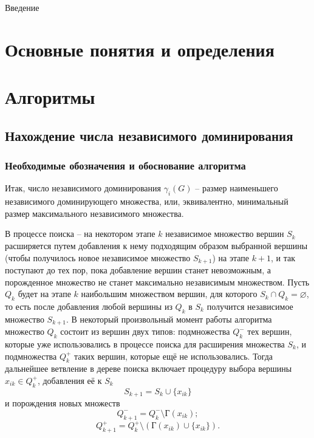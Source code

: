 \documentclass[bachelor, och, nir]{SCWorks}
\begin{document}




\tableofcontents

\intro
Введение

\section{Основные понятия и определения}

\section{Алгоритмы} 
\subsection{Нахождение числа независимого доминирования}
\subsubsection{Необходимые обозначения и обоснование алгоритма}
Итак, число независимого доминирования $\gamma_i(G)$ -- размер наименьшего независимого доминирующего множества,
или, эквивалентно, минимальный размер максимального независимого множества.

В процессе поиска -- на некотором этапе $k$ независимое множество вершин $S_k$ расширяется путем добавления к нему подходящим образом выбранной вершины (чтобы получилось новое независимое множество $S_{k+1}$) на этапе $k+1$, и так поступают до тех пор, пока добавление вершин станет невозможным, а порожденное множество не станет максимально независимым множеством. Пусть $Q_k$ будет на этапе $k$ наибольшим множеством вершин, для которого $S_k \cap Q_k= \varnothing$, то есть после добавления любой вершины из $Q_k$ в $S_k$ получится независимое множество $S_{k+1}$. В некоторый произвольный момент работы алгоритма множество $Q_k$ состоит из вершин двух типов: подмножества $Q_k^-$ тех вершин, которые уже использовались в процессе поиска для расширения множества $S_k$, и подмножества $Q_k^+$ таких вершин, которые ещё не использовались. Тогда дальнейшее ветвление в дереве поиска включает процедуру выбора вершины $x_{ik} \in Q_k^+$, добавления её к $S_k$
\[ S_{k + 1} = S_k \cup \{x_{ik}\} \]
и порождения новых множеств
\[ Q_{k +1 }^- = Q_k^- \setminus \text{Г}(x_{ik});  \]
\[ Q_{k + 1}^+ = Q_k^+ \setminus (\text{Г}(x_{ik}) \cup \{x_{ik}\}). \]
\end{document}

